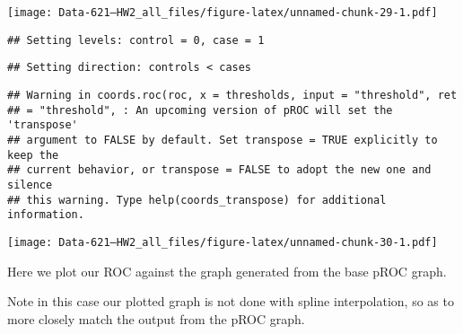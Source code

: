 \documentclass[]{article}
\newenvironment{Shaded}{\begin{snugshade}}{\end{snugshade}}
\newcommand{\CommentTok}[1]{\textcolor[rgb]{0.56,0.35,0.01}{\textit{#1}}}
\newcommand{\DataTypeTok}[1]{\textcolor[rgb]{0.13,0.29,0.53}{#1}}
\newcommand{\KeywordTok}[1]{\textcolor[rgb]{0.13,0.29,0.53}{\textbf{#1}}}
\newcommand{\NormalTok}[1]{#1}
\newcommand{\OperatorTok}[1]{\textcolor[rgb]{0.81,0.36,0.00}{\textbf{#1}}}
\newcommand{\OtherTok}[1]{\textcolor[rgb]{0.56,0.35,0.01}{#1}}
\newcommand{\StringTok}[1]{\textcolor[rgb]{0.31,0.60,0.02}{#1}}
\begin{document}
\texttt{[image: Data-621---HW2\_all\_files/figure-latex/unnamed-chunk-29-1.pdf]}

\begin{Shaded}
\end{Shaded}

\begin{verbatim}
## Setting levels: control = 0, case = 1
\end{verbatim}

\begin{verbatim}
## Setting direction: controls < cases
\end{verbatim}

\begin{verbatim}
## Warning in coords.roc(roc, x = thresholds, input = "threshold", ret
## = "threshold", : An upcoming version of pROC will set the 'transpose'
## argument to FALSE by default. Set transpose = TRUE explicitly to keep the
## current behavior, or transpose = FALSE to adopt the new one and silence
## this warning. Type help(coords_transpose) for additional information.
\end{verbatim}

\texttt{[image: Data-621---HW2\_all\_files/figure-latex/unnamed-chunk-30-1.pdf]}

Here we plot our ROC against the graph generated from the base pROC
graph.

Note in this case our plotted graph is not done with spline
interpolation, so as to more closely match the output from the pROC
graph.
\end{document}
